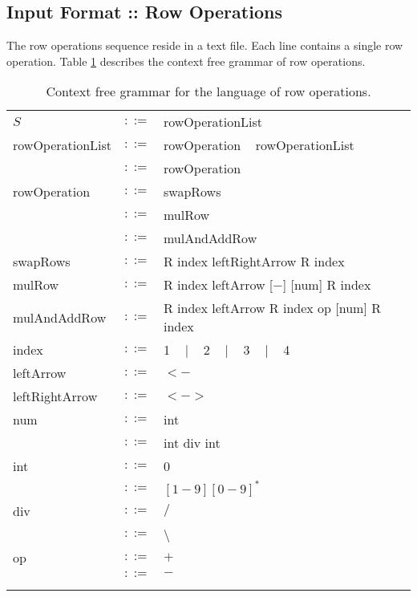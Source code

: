 \documentclass{article}
\begin{document}
\subsection*{Input Format :: Row Operations}
The row operations sequence reside in a text file.
Each line contains a single row operation.
Table \ref{Table_CFG_Of_Row_Operations}
describes the context free grammar of row operations.
\begin{table}[h]
\centering
\begin{tabular}{ l c l }
  $S$              & $::=$ & rowOperationList                            \\
  rowOperationList & $::=$ & rowOperation ~ rowOperationList             \\
                   & $::=$ & rowOperation                                \\
  rowOperation     & $::=$ & swapRows                                    \\
                   & $::=$ & mulRow                                      \\
                   & $::=$ & mulAndAddRow                                \\
  swapRows         & $::=$ & R index leftRightArrow R index              \\
  mulRow           & $::=$ & R index leftArrow [$-$] [num] R index       \\
  mulAndAddRow     & $::=$ & R index leftArrow R index op [num] R index  \\
  index            & $::=$ & 1 ~ $|$ ~ 2 ~ $|$ ~ 3 ~ $|$ ~ 4             \\
  leftArrow        & $::=$ & $<-$                                        \\
  leftRightArrow   & $::=$ & $<->$                                       \\
  num              & $::=$ & int                                         \\
                   & $::=$ & int div int                                 \\
  int              & $::=$ & 0                                           \\
                   & $::=$ & $[1-9][0-9]^{*}$                            \\
  div              & $::=$ & $/$                                         \\
                   & $::=$ & \textbackslash                              \\
  op               & $::=$ & $+$                                         \\
                   & $::=$ & $-$                                         \\ \\ \\
\end{tabular}
\caption{
Context free grammar for the language of row operations.
\label{Table_CFG_Of_Row_Operations}}
\end{table}
\end{document}
